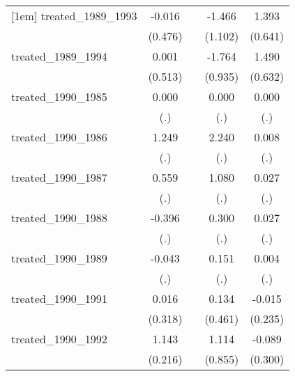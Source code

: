 {\begin{tabular}{l*{4}{c}}
[1em]
treated\_1989\_1993&      -0.016         &                     &      -1.466         &       1.393\sym{*}  \\
            &     (0.476)         &                     &     (1.102)         &     (0.641)         \\
[1em]
treated\_1989\_1994&       0.001         &                     &      -1.764         &       1.490\sym{*}  \\
            &     (0.513)         &                     &     (0.935)         &     (0.632)         \\
[1em]
treated\_1990\_1985&       0.000         &                     &       0.000         &       0.000         \\
            &         (.)         &                     &         (.)         &         (.)         \\
[1em]
treated\_1990\_1986&       1.249         &                     &       2.240         &       0.008         \\
            &         (.)         &                     &         (.)         &         (.)         \\
[1em]
treated\_1990\_1987&       0.559         &                     &       1.080         &       0.027         \\
            &         (.)         &                     &         (.)         &         (.)         \\
[1em]
treated\_1990\_1988&      -0.396         &                     &       0.300         &       0.027         \\
            &         (.)         &                     &         (.)         &         (.)         \\
[1em]
treated\_1990\_1989&      -0.043         &                     &       0.151         &       0.004         \\
            &         (.)         &                     &         (.)         &         (.)         \\
[1em]
treated\_1990\_1991&       0.016         &                     &       0.134         &      -0.015         \\
            &     (0.318)         &                     &     (0.461)         &     (0.235)         \\
[1em]
treated\_1990\_1992&       1.143\sym{***}&                     &       1.114         &      -0.089         \\
            &     (0.216)         &                     &     (0.855)         &     (0.300)         \\

\end{tabular}}
